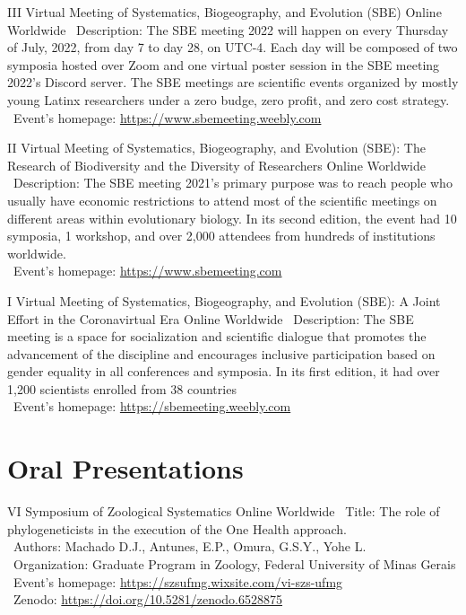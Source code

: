 \documentclass[11pt, letterpaper, sans]{moderncv}
\begin{document}
	{III Virtual Meeting of Systematics, Biogeography, and Evolution (SBE)}
	{Online}
	{Worldwide}
	{}
	{
		\textbullet~Description: The SBE meeting 2022 will happen on every Thursday of July, 2022, from day 7 to day 28, on UTC-4. Each day will be composed of two symposia hosted over Zoom and one virtual poster session in the SBE meeting 2022's Discord server. The SBE meetings are scientific events organized by mostly young Latinx researchers under a zero budge, zero profit, and zero cost strategy.\\
		\textbullet~Event's homepage: \url{https://www.sbemeeting.weebly.com}
	}

	{II Virtual Meeting of Systematics, Biogeography, and Evolution (SBE): The Research of Biodiversity and the Diversity of Researchers}
	{Online}
	{Worldwide}
	{}
	{
		\textbullet~Description: The SBE meeting 2021's primary purpose was to reach people who usually have economic restrictions to attend most of the scientific meetings on different areas within evolutionary biology. In its second edition, the event had 10 symposia, 1 workshop, and over 2,000 attendees from hundreds of institutions worldwide.\\
		\textbullet~Event's homepage: \url{https://www.sbemeeting.com}
	}

	{I Virtual Meeting of Systematics, Biogeography, and Evolution (SBE): A Joint Effort in the Coronavirtual Era}
	{Online}
	{Worldwide}
	{}
	{
		\textbullet~Description: The SBE meeting is a space for socialization and scientific dialogue that promotes the advancement of the discipline and encourages inclusive participation based on gender equality in all conferences and symposia. In its first edition, it had over 1,200 scientists enrolled from 38 countries\\
		\textbullet~Event's homepage: \url{https://sbemeeting.weebly.com}
	}


\section{Oral Presentations}

	{VI Symposium of Zoological Systematics}
	{Online}
	{Worldwide}
	{}
	{
		\textbullet~Title: The role of phylogeneticists in the execution of the One Health approach.\\
		\textbullet~Authors: Machado D.J., Antunes, E.P., Omura, G.S.Y., Yohe L.\\
		\textbullet~Organization: Graduate Program in Zoology, Federal University of Minas Gerais\\
		\textbullet~Event's homepage: \url{https://szsufmg.wixsite.com/vi-szs-ufmg}\\
		\textbullet~Zenodo: \url{https://doi.org/10.5281/zenodo.6528875}
	}
\end{document}

